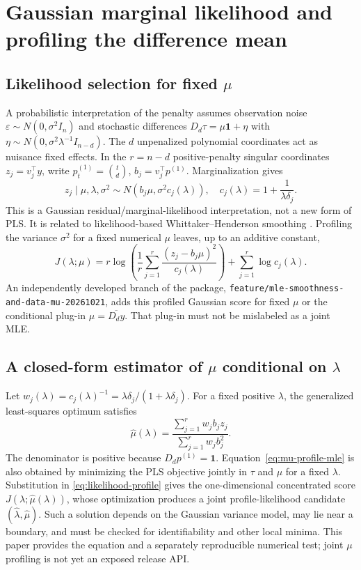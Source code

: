 \section{Gaussian marginal likelihood and profiling the difference mean}
\subsection{Likelihood selection for fixed $\mu$}
A probabilistic interpretation of the penalty assumes observation
noise $\varepsilon\sim N(0,\sigma^2I_n)$ and stochastic differences
$D_d\tau=\mu\mathbf1+\eta$ with
$\eta\sim N(0,\sigma^2\lambda^{-1}I_{n-d})$.
The $d$ unpenalized polynomial coordinates act as nuisance
fixed effects. In the $r=n-d$ positive-penalty singular coordinates
$z_j=v_j^\top y$, write $p^{(1)}_t=\binom td$,
$b_j=v_j^\top p^{(1)}$. Marginalization gives
\begin{equation}\label{eq:marginal-model}
z_j\mid\mu,\lambda,\sigma^2
\sim N\left(b_j\mu,\sigma^2c_j(\lambda)\right),\quad
c_j(\lambda)=1+\frac{1}{\lambda\delta_j}.
\end{equation}
This is a Gaussian residual/marginal-likelihood interpretation,
not a new form of PLS. It is related to likelihood-based
Whittaker--Henderson smoothing \cite{biessy2026wh}.
Profiling the variance $\sigma^2$ for a fixed numerical $\mu$
leaves, up to an additive constant,
\begin{equation}\label{eq:likelihood-profile}
J(\lambda;\mu)=r\log\left(
\frac{1}{r}\sum_{j=1}^{r}
\frac{(z_j-b_j\mu)^2}{c_j(\lambda)}
\right)+\sum_{j=1}^{r}\log c_j(\lambda).
\end{equation}
An independently developed branch of the package,
\texttt{feature/mle-smoothness-and-data-mu-20261021},
adds this profiled Gaussian score for fixed $\mu$ or
the conditional plug-in $\mu=\overline{D_dy}$.
That plug-in must not be mislabeled as a joint MLE.

\subsection{A closed-form estimator of $\mu$ conditional on $\lambda$}
Let $w_j(\lambda)=c_j(\lambda)^{-1}
=\lambda\delta_j/(1+\lambda\delta_j)$.
For a fixed positive $\lambda$, the generalized
least-squares optimum satisfies
\begin{equation}\label{eq:mu-profile-mle}
\widehat\mu(\lambda)
=\frac{\sum_{j=1}^{r}w_jb_jz_j}
{\sum_{j=1}^{r}w_jb_j^2}.
\end{equation}
The denominator is positive because $D_dp^{(1)}=\mathbf1$.
Equation~\eqref{eq:mu-profile-mle} is also obtained by
minimizing the PLS objective jointly in $\tau$ and $\mu$
for a fixed $\lambda$. Substitution in
\eqref{eq:likelihood-profile} gives the one-dimensional
concentrated score
$J(\lambda;\widehat\mu(\lambda))$,
whose optimization produces a joint profile-likelihood
candidate $(\widehat\lambda,\widehat\mu)$.
Such a solution depends on the Gaussian variance model,
may lie near a boundary, and must be checked for
identifiability and other local minima. This paper provides
the equation and a separately reproducible numerical test;
joint $\mu$ profiling is not yet an exposed release API.

